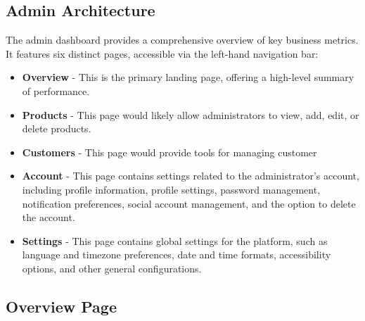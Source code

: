 \documentclass[11pt,a4paper]{article}
\begin{document}
\subsection{Admin Architecture}\label{subsec:admin-architecture}
	The admin dashboard provides a comprehensive overview of key business metrics. It features six distinct pages, accessible via the left-hand navigation bar:
\begin{itemize}
\item \textbf{Overview} - This is the primary landing page, offering a high-level summary of performance.
\item \textbf{Products} - This page would likely allow administrators to view, add, edit, or delete products.
\item \textbf{Customers} - This page would provide tools for managing customer
\item \textbf{Account} - This page contains settings related to the administrator's account, including profile information, profile settings, password management, notification preferences, social account management, and the option to delete the account.
\item \textbf{Settings} - This page contains global settings for the platform, such as language and timezone preferences, date and time formats, accessibility options, and other general configurations.
\end{itemize}
\subsection{Overview Page}\label{subsec:overview-page}
\end{document}
